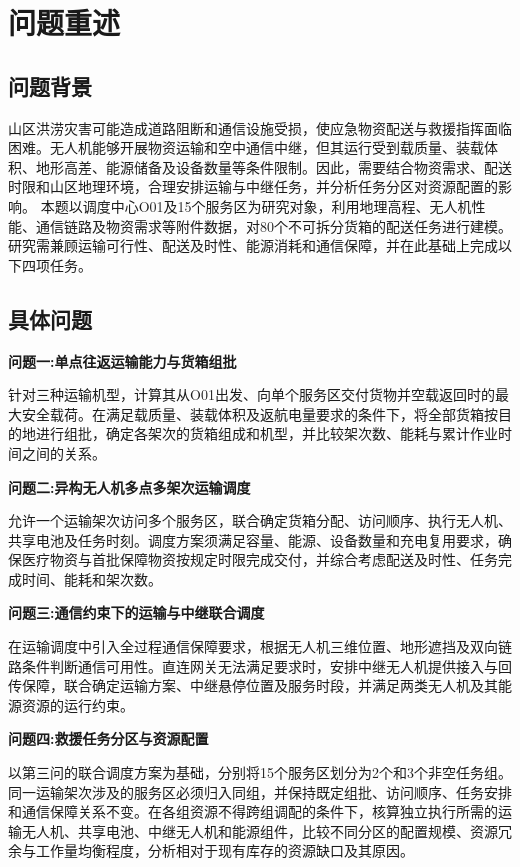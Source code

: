 \documentclass[bwprint]{gmcmthesis}
\begin{document}
\pagestyle{plain}

\maketoc

\clearpage

\section{问题重述}
\subsection{问题背景}
山区洪涝灾害可能造成道路阻断和通信设施受损，使应急物资配送与救援指挥面临困难。无人机能够开展物资运输和空中通信中继，但其运行受到载质量、装载体积、地形高差、能源储备及设备数量等条件限制。因此，需要结合物资需求、配送时限和山区地理环境，合理安排运输与中继任务，并分析任务分区对资源配置的影响。
本题以调度中心O01及15个服务区为研究对象，利用地理高程、无人机性能、通信链路及物资需求等附件数据，对80个不可拆分货箱的配送任务进行建模。研究需兼顾运输可行性、配送及时性、能源消耗和通信保障，并在此基础上完成以下四项任务。
\subsection{具体问题}
\textbf{问题一:单点往返运输能力与货箱组批}

针对三种运输机型，计算其从O01出发、向单个服务区交付货物并空载返回时的最大安全载荷。在满足载质量、装载体积及返航电量要求的条件下，将全部货箱按目的地进行组批，确定各架次的货箱组成和机型，并比较架次数、能耗与累计作业时间之间的关系。

\textbf{问题二:异构无人机多点多架次运输调度}

允许一个运输架次访问多个服务区，联合确定货箱分配、访问顺序、执行无人机、共享电池及任务时刻。调度方案须满足容量、能源、设备数量和充电复用要求，确保医疗物资与首批保障物资按规定时限完成交付，并综合考虑配送及时性、任务完成时间、能耗和架次数。

\textbf{问题三:通信约束下的运输与中继联合调度}

在运输调度中引入全过程通信保障要求，根据无人机三维位置、地形遮挡及双向链路条件判断通信可用性。直连网关无法满足要求时，安排中继无人机提供接入与回传保障，联合确定运输方案、中继悬停位置及服务时段，并满足两类无人机及其能源资源的运行约束。

\textbf{问题四:救援任务分区与资源配置}

以第三问的联合调度方案为基础，分别将15个服务区划分为2个和3个非空任务组。同一运输架次涉及的服务区必须归入同组，并保持既定组批、访问顺序、任务安排和通信保障关系不变。在各组资源不得跨组调配的条件下，核算独立执行所需的运输无人机、共享电池、中继无人机和能源组件，比较不同分区的配置规模、资源冗余与工作量均衡程度，分析相对于现有库存的资源缺口及其原因。
\clearpage
\end{document}
